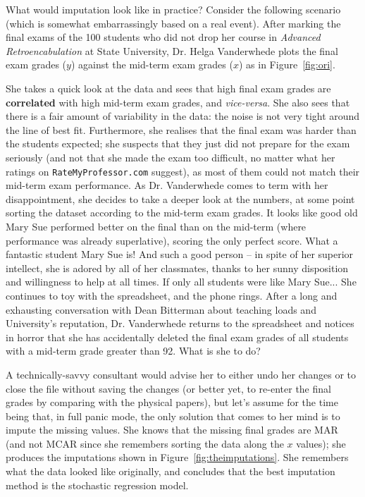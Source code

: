 \afterpage{\FloatBarrier}
What would imputation look like in practice? Consider the following scenario (which is somewhat embarrassingly based on a real event). After marking the final exams of the 100 students who did not drop her course in \textit{Advanced Retroencabulation} at State University, Dr. Helga Vanderwhede plots the final exam grades ($y$) against the mid-term exam grades ($x$) as in Figure~\ref{fig:ori}. \par She takes a quick look at the data and sees that high final exam grades are \textbf{correlated} with high mid-term exam grades, and \textit{vice-versa}. She also sees that there is a fair amount of variability in the data: the noise is not very tight around the line of best fit. Furthermore, she realises that the final exam was harder than the students expected; she suspects that they just did not prepare for the exam seriously (and not that she made the exam too difficult, no matter what her ratings on \texttt{RateMyProfessor.com} suggest), as most of them could not match their mid-term exam performance. 
\newpage\noindent As Dr. Vanderwhede comes to term with her disappointment, she decides to take a deeper look at the numbers, at some point sorting the dataset according to the mid-term exam grades. It looks like good old Mary Sue performed better on the final than on the mid-term (where performance was already superlative), scoring the only perfect score. What a fantastic student Mary Sue is! And such a good person -- in spite of her superior intellect, she is adored by all of her classmates, thanks to her sunny disposition and willingness to help at all times. If only all students were like Mary Sue... She continues to toy with the spreadsheet, and the phone rings. After a long and exhausting conversation with Dean Bitterman about teaching loads and University's reputation, Dr. Vanderwhede returns to the spreadsheet and notices in horror that she has accidentally deleted the final exam grades of all students with a mid-term grade greater than 92. What is she to do? \par A technically-savvy consultant would advise her to either undo her changes or to close the file without saving the changes (or better yet, to re-enter the final grades by comparing with the physical papers), but let's assume for the time being that, in full panic mode, the only solution that comes to her mind is to impute the missing values. She knows that the missing final grades are MAR (and not MCAR since she remembers sorting the data along the $x$ values); she produces the imputations shown in Figure~\ref{fig:theimputations}. She remembers what the data looked like originally, and concludes that the best imputation method is the stochastic regression model.

